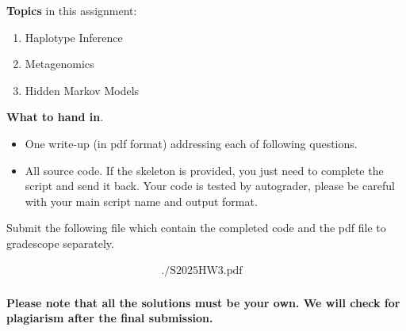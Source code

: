 \noindent 
{\bf Topics} in this assignment: 
\begin{enumerate}
\item Haplotype Inference
\item Metagenomics
\item Hidden Markov Models

\end{enumerate}
\vspace{0.2in}


\noindent 
{\bf What to hand in}. 
\begin{itemize}
\item One write-up (in pdf format) addressing each of following questions.
\item All source code. If the skeleton is provided, you just need to complete the script and send it back. Your code is tested by autograder, please be careful with your main script name and output format.
\end{itemize}

Submit the following file which contain the completed code and the
pdf file to gradescope separately. 

\[
  \begin{array}{lllll}
    ./\text{S2025HW3.pdf}&  \\
  \end{array}
\]

\textbf{ Please note that all the solutions must be your own. We will check for plagiarism after the final submission. } 